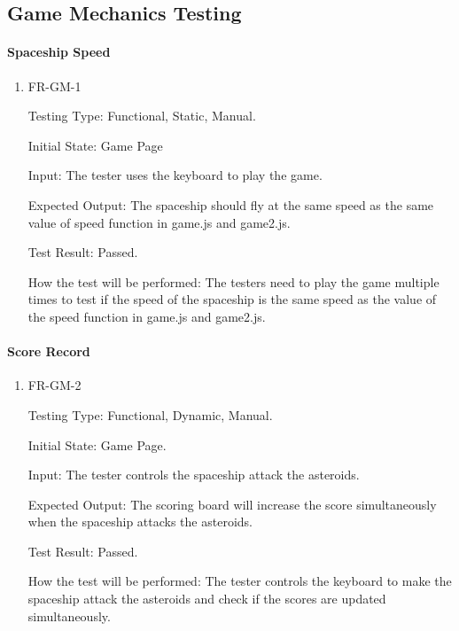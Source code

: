 \documentclass[12pt, titlepage]{article}
\begin{document}
\subsection{Game Mechanics Testing}
\paragraph{Spaceship Speed}
\begin{enumerate}					
\item{FR-GM-1\\}

Testing Type: Functional, Static, Manual.  

Initial State: Game Page

Input: The tester uses the keyboard to play the game.

Expected Output: The spaceship should fly at the same speed as the same value of speed function in game.js and game2.js.

Test Result: Passed.

How the test will be performed: The testers need to play the game multiple times to test if the speed of the spaceship is the same speed as the value of the speed function in game.js and game2.js.
\\
\end{enumerate}

\paragraph{Score Record}
\begin{enumerate}					
\item{FR-GM-2\\}

Testing Type: Functional, Dynamic, Manual.  

Initial State: Game Page.

Input: The tester controls the spaceship attack the asteroids.

Expected Output: The scoring board will increase the score simultaneously when the spaceship attacks the asteroids.

Test Result: Passed.

How the test will be performed: The tester controls the keyboard to make the spaceship attack the asteroids and check if the scores are updated simultaneously.

\end{enumerate}
\end{document}
